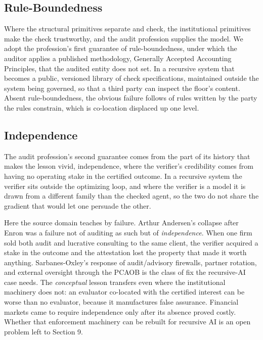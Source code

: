 \documentclass[11pt]{article}
\begin{document}
\subsection{Rule-Boundedness}

Where the structural primitives separate and check, the institutional primitives make the check trustworthy, and the audit profession supplies the model. We adopt the profession's first guarantee of rule-boundedness, under which the auditor applies a published methodology, Generally Accepted Accounting Principles, that the audited entity does not set. In a recursive system that becomes a public, versioned library of check specifications, maintained outside the system being governed, so that a third party can inspect the floor's content. Absent rule-boundedness, the obvious failure follows of rules written by the party the rules constrain, which is co-location displaced up one level.

\subsection{Independence}

The audit profession's second guarantee comes from the part of its history that makes the lesson vivid, independence, where the verifier's credibility comes from having no operating stake in the certified outcome. In a recursive system the verifier sits outside the optimizing loop, and where the verifier is a model it is drawn from a different family than the checked agent, so the two do not share the gradient that would let one persuade the other.

Here the source domain teaches by failure. Arthur Andersen's collapse after Enron was a failure not of auditing as such but of \emph{independence}. When one firm sold both audit and lucrative consulting to the same client, the verifier acquired a stake in the outcome and the attestation lost the property that made it worth anything. Sarbanes-Oxley's response of audit/advisory firewalls, partner rotation, and external oversight through the PCAOB is the class of fix the recursive-AI case needs. The \emph{conceptual} lesson transfers even where the institutional machinery does not: an evaluator co-located with the certified interest can be worse than no evaluator, because it manufactures false assurance. Financial markets came to require independence only after its absence proved costly. Whether that enforcement machinery can be rebuilt for recursive AI is an open problem left to Section 9.
\end{document}
